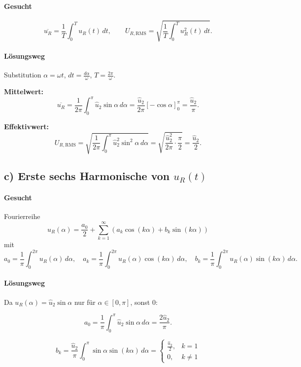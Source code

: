\paragraph{Gesucht}
\[
\overline{u_R}=\frac{1}{T}\int_0^T u_R(t)\,dt,
\qquad
U_{R,\mathrm{RMS}}=\sqrt{\frac{1}{T}\int_0^T u_R^2(t)\,dt}.
\]

\paragraph{Lösungsweg}
Substitution $\alpha=\omega t$, $dt=\frac{d\alpha}{\omega}$, $T=\frac{2\pi}{\omega}$.

\textbf{Mittelwert:}
\[
\overline{u_R}
=\frac{1}{2\pi}\int_0^{\pi}\hat u_2\sin\alpha\,d\alpha
=\frac{\hat u_2}{2\pi}\left[-\cos\alpha\right]_0^\pi
=\boxed{\frac{\hat u_2}{\pi}}.
\]

\textbf{Effektivwert:}
\[
U_{R,\mathrm{RMS}}
=\sqrt{\frac{1}{2\pi}\int_0^{\pi}\hat u_2^2\sin^2\alpha\,d\alpha}
=
\sqrt{\frac{\hat u_2^2}{2\pi}\cdot\frac{\pi}{2}}
=
\boxed{\frac{\hat u_2}{2}}.
\]

\subsection*{c) Erste sechs Harmonische von $u_R(t)$}

\paragraph{Gesucht}
Fourierreihe
\[
u_R(\alpha)=\frac{a_0}{2}+\sum_{k=1}^{\infty}\left(a_k\cos(k\alpha)+b_k\sin(k\alpha)\right)
\]
mit
\[
a_0=\frac{1}{\pi}\int_0^{2\pi}u_R(\alpha)\,d\alpha,\quad
a_k=\frac{1}{\pi}\int_0^{2\pi}u_R(\alpha)\cos(k\alpha)\,d\alpha,\quad
b_k=\frac{1}{\pi}\int_0^{2\pi}u_R(\alpha)\sin(k\alpha)\,d\alpha.
\]

\paragraph{Lösungsweg}
Da $u_R(\alpha)=\hat u_2\sin\alpha$ nur für $\alpha\in[0,\pi]$, sonst 0:

\[
a_0=\frac{1}{\pi}\int_0^{\pi}\hat u_2\sin\alpha\,d\alpha
=\boxed{\frac{2\hat u_2}{\pi}}.
\]

\[
b_k=\frac{\hat u_2}{\pi}\int_0^{\pi}\sin\alpha\sin(k\alpha)\,d\alpha
=
\begin{cases}
\frac{\hat u_2}{2}, & k=1\\
0, & k\neq 1
\end{cases}
\]

